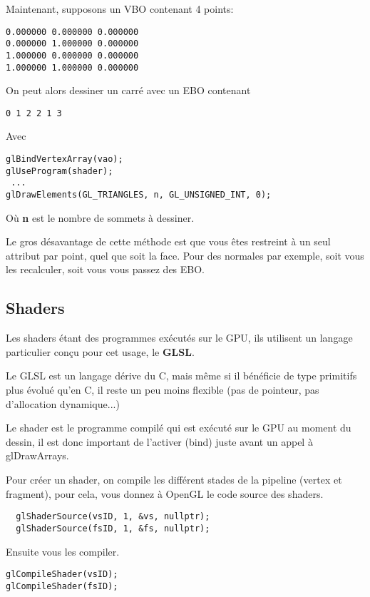 \documentclass[pdftex, 11pt, a4paper, titlepage]{article}
\begin{document}
Maintenant, supposons un VBO contenant 4 points:
\begin{verbatim}
0.000000 0.000000 0.000000
0.000000 1.000000 0.000000
1.000000 0.000000 0.000000
1.000000 1.000000 0.000000
\end{verbatim}

On peut alors dessiner un carré avec un EBO contenant

\begin{verbatim}
0 1 2 2 1 3
\end{verbatim}

Avec
\begin{lstlisting}
glBindVertexArray(vao);
glUseProgram(shader);
 ...
glDrawElements(GL_TRIANGLES, n, GL_UNSIGNED_INT, 0);
\end{lstlisting}

Où \textbf{n} est le nombre de sommets à dessiner.

Le gros désavantage de cette méthode est que vous êtes restreint à un
seul attribut par point, quel que soit la face. Pour des normales par
exemple, soit vous les recalculer, soit vous vous passez des EBO.

\pagebreak

\subsection{Shaders}

Les shaders étant des programmes exécutés sur le GPU, ils utilisent un
langage particulier conçu pour cet usage, le \textbf{GLSL}.

Le GLSL est un langage dérive du C, mais même si il bénéficie de type
primitifs plus évolué qu'en C, il reste un peu moins flexible (pas de
pointeur, pas d'allocation dynamique...)

Le shader est le programme compilé qui est exécuté sur le GPU au
moment du dessin, il est donc important de l'activer (bind) juste
avant un appel à glDrawArrays.

Pour créer un shader, on compile les différent stades de la pipeline
(vertex et fragment), pour cela, vous donnez à OpenGL le code source
des shaders.
\begin{lstlisting}
  glShaderSource(vsID, 1, &vs, nullptr);
  glShaderSource(fsID, 1, &fs, nullptr);
\end{lstlisting}

Ensuite vous les compiler.

\begin{lstlisting}
glCompileShader(vsID);
glCompileShader(fsID);
\end{lstlisting}
\end{document}
